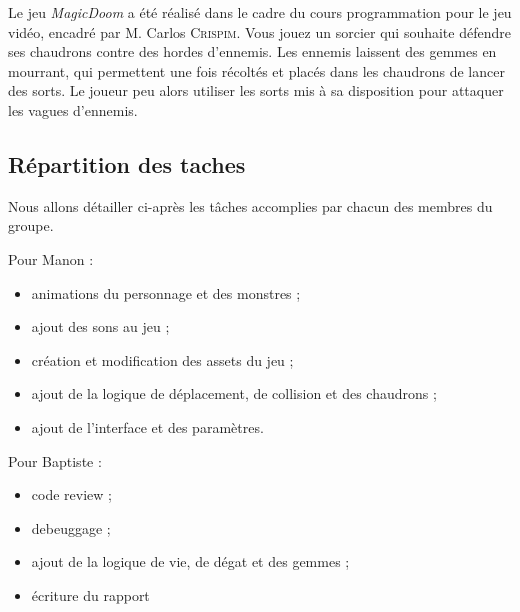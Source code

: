 Le jeu \textit{MagicDoom} a été réalisé dans le cadre du cours programmation pour le jeu vidéo, encadré par M. Carlos \textsc{Crispim}. Vous jouez un sorcier qui souhaite défendre ses chaudrons contre des hordes d'ennemis. Les ennemis laissent des gemmes en mourrant, qui permettent une fois récoltés et placés dans les chaudrons de lancer des sorts. Le joueur peu alors utiliser les sorts mis à sa disposition pour attaquer les vagues d'ennemis.

\subsection{Répartition des taches}

Nous allons détailler ci-après les tâches accomplies par chacun des membres du groupe.

Pour Manon :
\begin{itemize}
    \item animations du personnage et des monstres ;
    \item ajout des sons au jeu ;
    \item création et modification des assets du jeu ;
    \item ajout de la logique de déplacement, de collision et des chaudrons ;
    \item ajout de l'interface et des paramètres.

\end{itemize}

Pour Baptiste :
\begin{itemize}
    \item code review ;
    \item debeuggage ;
    \item ajout de la logique de vie, de dégat et des gemmes ;
    \item écriture du rapport
\end{itemize}